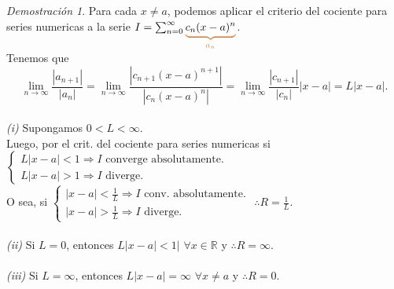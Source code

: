 \documentclass{article}
\theoremstyle{definition}
\theoremstyle{remark}
\newtheorem*{demo}{Demostración}
\begin{document}
\begin{demo}
  Para cada $x\neq a$, podemos aplicar el criterio del cociente para series numericas a la serie $I=\sum_{n=0}^{\infty}{\textcolor{rojop2}{\underbrace{\textcolor{black}{c_n(x-a)^n}}_{a_n}}}$.
\\
Tenemos que \[
  \lim_{n\to\infty}{\frac{\left|a_{n+1}\right|}{\left|a_n\right|}}=\lim_{n\to\infty}{\frac{\left|c_{n+1}(x-a)^{n+1}\right|}{\left|c_n(x-a)^n\right|}}=\lim_{n\to\infty}{\frac{\left|c_{n+1}\right|}{\left|c_n\right|}|x-a|}=L|x-a|.
\]\\
\emph{(i)\phantom{ii}} Supongamos $0<L<\infty$. \\
Luego, por el crit. del cociente para series numericas si $\left\{\begin{array}{l}
    L|x-a|<1 \Rightarrow I \text{ converge absolutamente.} \\
    L|x-a|>1 \Rightarrow I \text{ diverge.}
\end{array}\right.$ \\ 
O sea, si $\left\{\begin{array}{l}
    |x-a|<\frac{1}{L} \Rightarrow I \text{ conv. absolutamente.} \\ 
    |x-a| > \frac{1}{L} \Rightarrow I \text{ diverge}.
\end{array}\right.$ \quad \quad $\therefore R=\frac{1}{L}.$ \\\\
\emph{(ii)\phantom{i}} Si $L=0$,\phantom{,,} entonces $L|x-a|<1|$ $ \forall x \in \mathbb{R}$ y $\therefore R=\infty$. \\ \\
\emph{(iii)} Si $L=\infty$, entonces $L|x-a|=\infty$ $\forall x \neq a$ y $\therefore R=0$.
\end{demo}
\end{document}
